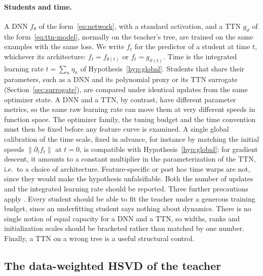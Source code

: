 \documentclass[11pt]{article}
\newcommand{\norm}[1]{\lVert #1\rVert}
\theoremstyle{definition}
\numberwithin{equation}{section}
\begin{document}
\paragraph{Students and time.}
A DNN $f_\theta$ of the form~\eqref{eq:network}, with a standard activation, and a TTN $g_\vartheta$ of the form~\eqref{eq:ttn-model}, normally on the teacher's tree, are trained on the same examples with the same loss. We write $f_t$ for the predictor of a student at time $t$, whichever its architecture: $f_t=f_{\theta(t)}$ or $f_t=g_{\vartheta(t)}$. Time is the integrated learning rate $t=\sum_n\eta_n$ of Hypothesis~\ref{hyp:global}. Students that share their parameters, such as a DNN and its polynomial proxy or its TTN surrogate (Section~\ref{sec:surrogate}), are compared under identical updates from the same optimizer state. A DNN and a TTN, by contrast, have different parameter metrics, so the same raw learning rate can move them at very different speeds in function space. The optimizer family, the tuning budget and the time convention must then be fixed before any feature curve is examined. A single global calibration of the time scale, fixed in advance, for instance by matching the initial speeds $\norm{\partial_tf_t}$ at $t=0$, is compatible with Hypothesis~\ref{hyp:global}: for gradient descent, it amounts to a constant multiplier in the parameterization of the TTN, i.e.\ to a choice of architecture. Feature-specific or post hoc time warps are not, since they would make the hypothesis unfalsifiable. Both the number of updates and the integrated learning rate should be reported. Three further precautions apply \citep[Sections~6.6 and~6.7]{hfl_surrogate}. Every student should be able to fit the teacher under a generous training budget, since an underfitting student says nothing about dynamics. There is no single notion of equal capacity for a DNN and a TTN, so widths, ranks and initialization scales should be bracketed rather than matched by one number. Finally, a TTN on a wrong tree is a useful structural control.

\subsection{The data-weighted HSVD of the teacher}\label{sec:dw-hsvd}
\end{document}
